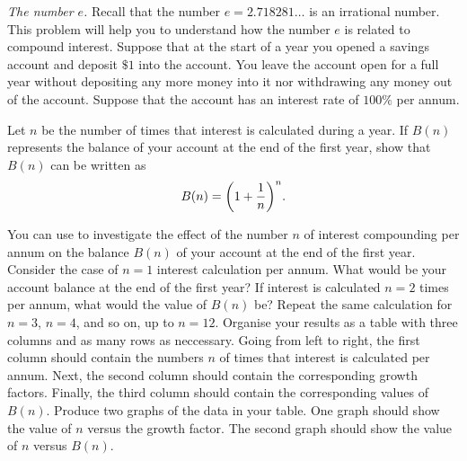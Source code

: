 \documentclass[a4paper,oneside,12pt]{article}
\begin{document}
\begin{problem}
\item\emph{The number $e$.}
  Recall that the number $e = 2.718281\dots$ is an irrational number.
  This problem will help you to understand how the number $e$ is
  related to compound interest.  Suppose that at the start of a year
  you opened a savings account and deposit $\$1$ into the account.
  You leave the account open for a full year without depositing any
  more money into it nor withdrawing any money out of the account.
  Suppose that the account has an interest rate of $100\%$ per annum.
  \begin{packedenum}
  \item\label{subprob:e_balance_formula}
    Let $n$ be the number of times that interest is calculated during
    a year.  If $B(n)$ represents the balance of your account at the
    end of the first year, show that $B(n)$ can be written as
    \begin{equation}
    \label{eqn:e_savings_first_year_n_compounding}
    B(n)
    =
    \parenthesis*{
      1 + \frac{1}{n}
    }^n.
    \end{equation}

  \item\label{subprob:e_balance_up_to_12_compounding}
    You can use  to
    investigate the effect of the number $n$ of interest compounding
    per annum on the balance $B(n)$ of your account at the end of the
    first year.  Consider the case of $n = 1$ interest calculation per
    annum.  What would be your account balance at the end of the first
    year?  If interest is calculated $n = 2$ times per annum, what
    would the value of $B(n)$ be?  Repeat the same calculation for
    $n = 3$, $n = 4$, and so on, up to $n = 12$.  Organise your
    results as a table with three columns and as many rows as
    neccessary.  Going from left to right, the first column should
    contain the numbers $n$ of times that interest is calculated per
    annum.  Next, the second column should contain the corresponding
    growth factors.  Finally, the third column should contain the
    corresponding values of $B(n)$.  Produce two graphs of the data in
    your table.  One graph should show the value of $n$ versus the
    growth factor.  The second graph should show the value of $n$
    versus $B(n)$.


\end{packedenum}
\end{problem}
\end{document}
